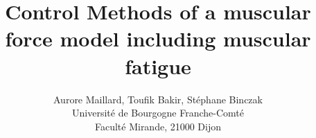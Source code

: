 \title{ Control Methods of a muscular force model including muscular fatigue}%

\author{Aurore Maillard, Toufik Bakir, Stéphane Binczak\\
Universit\'e de Bourgogne Franche-Comt\'e\\
Facult\'e Mirande, 21000 Dijon\\
}


